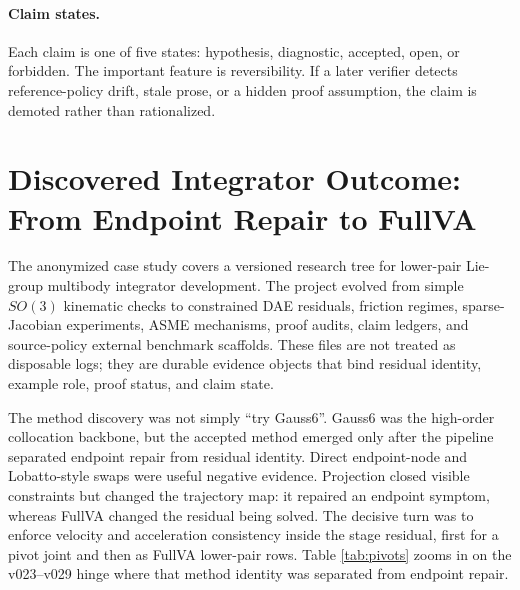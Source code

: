 \documentclass[10pt]{article}
\begin{document}
\paragraph{Claim states.}
Each claim is one of five states: hypothesis, diagnostic, accepted, open, or
forbidden. The important feature is reversibility. If a later verifier detects
reference-policy drift, stale prose, or a hidden proof assumption, the claim is
demoted rather than rationalized.

\section{Discovered Integrator Outcome: From Endpoint Repair to FullVA}

The anonymized case study covers a versioned research tree for lower-pair
Lie-group multibody integrator development. The project evolved from simple
$SO(3)$ kinematic checks to constrained DAE residuals, friction regimes,
sparse-Jacobian experiments, ASME mechanisms, proof audits, claim ledgers, and
source-policy external benchmark scaffolds. These files are not treated as
disposable logs; they are durable evidence objects that bind residual identity,
example role, proof status, and claim state.

The method discovery was not simply ``try Gauss6''. Gauss6 was the high-order
collocation backbone, but the accepted method emerged only after the pipeline
separated endpoint repair from residual identity. Direct endpoint-node and
Lobatto-style swaps were useful negative evidence. Projection closed visible
constraints but changed the trajectory map: it repaired an endpoint symptom,
whereas FullVA changed the residual being solved. The decisive turn was to
enforce velocity and acceleration consistency inside the stage residual, first
for a pivot joint and then as FullVA lower-pair rows. Table \ref{tab:pivots}
zooms in on the v023--v029 hinge where that method identity was separated from
endpoint repair.
\end{document}
